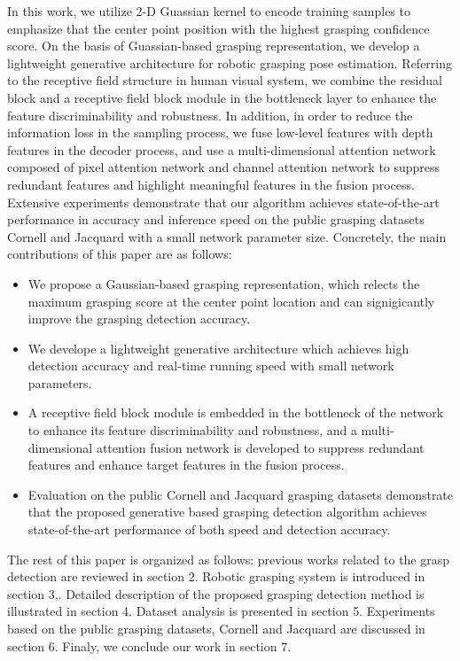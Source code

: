 \documentclass[journal]{IEEEtran}
\begin{document}
In this work, we utilize 2-D Guassian kernel to encode training samples to emphasize that the center point position with the highest grasping confidence score. On the basis of Guassian-based grasping representation, we develop a lightweight generative architecture for robotic grasping pose estimation. Referring to the receptive field structure in human visual system, we combine the residual block and a receptive field block module in the bottleneck layer to enhance the feature discriminability and robustness. In addition, in order to reduce the information loss in the sampling process, we fuse low-level features with depth features in the decoder process, and use a multi-dimensional attention network composed of pixel attention network and channel attention network to suppress redundant features and highlight meaningful features in the fusion process. Extensive experiments demonstrate that our algorithm achieves state-of-the-art performance in accuracy and inference speed on the public grasping datasets Cornell and Jacquard with a small network parameter size. Concretely, the main contributions of this paper are as follows:

\begin{itemize}
	
	\item  We propose a Gaussian-based grasping representation, which relects the maximum grasping score at the center point location and can signigicantly improve the grasping detection accuracy.
	\item We develope a lightweight generative architecture which achieves high detection accuracy and real-time running speed with small network parameters.
	\item A receptive field block module is embedded in the bottleneck of the network to enhance its feature discriminability and robustness, and a multi-dimensional attention fusion network is developed to suppress redundant features and enhance target features in the fusion process.
	\item Evaluation on the public Cornell and Jacquard grasping datasets demonstrate that the proposed generative based grasping detection algorithm achieves state-of-the-art performance of both speed and detection accuracy.
	
\end{itemize}

The rest of this paper is organized as follows: previous works related to the grasp detection are reviewed in section 2. Robotic grasping system is introduced in section 3,. Detailed description of the proposed grasping detection method is illustrated in section 4. Dataset analysis is presented in section 5. Experiments based on the public grasping datasets, Cornell and Jacquard are discussed in section 6. Finaly, we conclude our work in section 7.
 
\end{document}
